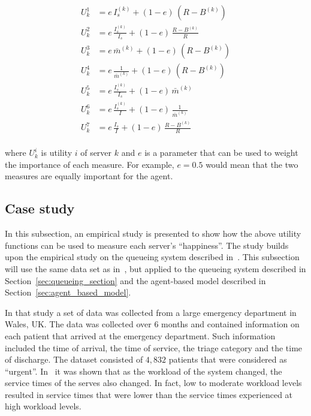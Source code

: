 \begin{align}
    U_k^1 &= e \, I_s^{(k)} + (1 - e) \, (R - B^{(k)})
    \label{eq:utility_1} \\
    U_k^2 &= e \, \frac{I_s^{(k)}}{I_s} + (1 - e) \, \frac{R - B^{(k)}}{R}
    \label{eq:utility_2} \\
    U_k^3 &= e \, \bar{m}^{(k)} + (1 - e) \, (R - B^{(k)})
    \label{eq:utility_3} \\
    U_k^4 &= e \, \frac{1}{\bar{m}^{(k)}} + (1 - e) \, (R - B^{(k)})
    \label{eq:utility_4} \\
    U_k^5 &= e \, \frac{I_s^{(k)}}{I_s} + (1 - e) \, \bar{m}^{(k)}
    \label{eq:utility_5} \\ 
    U_k^6 &= e \, \frac{I_s^{(k)}}{I} + (1 - e) \, \frac{1}{\bar{m}^{(k)}}
    \label{eq:utility_6} \\
    U_k^7 &= e \, \frac{I_s}{I} + (1 - e) \, \frac{R - B^{(k)}}{R}
    \label{eq:utility_7} \\
\end{align}

where \(U_k^i\) is utility \(i\) of server \(k\) and \(e\) is a parameter that
can be used to weight the importance of each measure.
For example, \(e = 0.5\) would mean that the two measures are equally important
for the agent.

\subsection{Case study}

In this subsection, an empirical study is presented to show how the above
utility functions can be used to measure each server's ``happiness''.
The study builds upon the empirical study on the queueing system described
in~\cite{harper2020server}.
This subsection will use the same data set as in~\cite{harper2020server}, but
applied to the queueing system described in Section~\ref{sec:queueing_section}
and the agent-based model described in Section~\ref{sec:agent_based_model}.

In that study a set of data was collected from a large emergency department in
Wales, UK.
The data was collected over 6 months and contained information
on each patient that arrived at the emergency department.
Such information included the time of arrival, the time of service, the triage
category and the time of discharge.
The dataset consisted of \(4,832\) patients that were considered as ``urgent''.
In~\cite{harper2020server} it was shown that as the workload of the system
changed, the service times of the serves also changed.
In fact, low to moderate workload levels resulted in service times that were
lower than the service times experienced at high workload levels.

